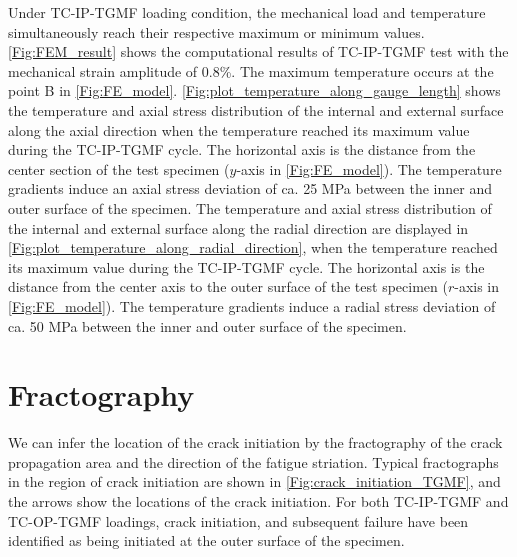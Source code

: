 \documentclass[preprint,5p,twocolumn,11pt,sort&compress]{elsarticle}
\begin{document}
Under TC-IP-TGMF loading condition, the mechanical load and temperature simultaneously reach their respective maximum or minimum values. \autoref{Fig:FEM_result} shows the computational results of TC-IP-TGMF test with the mechanical strain amplitude of 0.8\%. The maximum temperature occurs at the point B in \autoref{Fig:FE_model}.
\autoref{Fig:plot_temperature_along_gauge_length} shows the temperature and axial stress distribution of the internal and external surface along the axial direction when the temperature reached its maximum value during the TC-IP-TGMF cycle.
The horizontal axis is the distance from the center section of the test specimen ($y$-axis in \autoref{Fig:FE_model}). The temperature gradients induce an axial stress deviation of ca. 25 MPa between the inner and outer surface of the specimen.
The temperature and axial stress distribution of the internal and external surface along the radial direction are displayed in \autoref{Fig:plot_temperature_along_radial_direction}, when the temperature reached its maximum value during the TC-IP-TGMF cycle.
The horizontal axis is the distance from the center axis to the outer surface of the test specimen ($r$-axis in \autoref{Fig:FE_model}).
The temperature gradients induce a radial stress deviation of ca. 50 MPa between the inner and outer surface of the specimen.




\section{Fractography}
\noindent
We can infer the location of the crack initiation by the fractography of the crack propagation area and the direction of the fatigue striation.
Typical fractographs in the region of crack initiation are shown in \autoref{Fig:crack_initiation_TGMF}, and the arrows show the locations of the crack initiation. For both TC-IP-TGMF and TC-OP-TGMF loadings, crack initiation, and subsequent failure have been identified as being initiated at the outer surface of the specimen.
\end{document}
